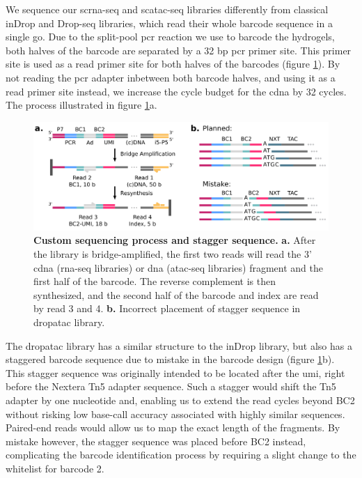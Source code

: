 We sequence our \acrshort{scrna-seq} and \acrshort{scatac-seq} libraries differently from classical inDrop and Drop-seq libraries, which read their whole barcode sequence in a single go. Due to the split-pool \acrshort{pcr} reaction we use to barcode the hydrogels, both halves of the barcode are separated by a 32 \acrshort{bp} \acrshort{pcr} primer site. This primer site is used as a read primer site for both halves of the barcodes (figure \ref{fig:seq_nextseq_library}). By not reading the \acrshort{pcr} adapter inbetween both barcode halves, and using it as a read primer site instead, we increase the cycle budget for the \acrshort{cdna} by 32 cycles. The process illustrated in figure \ref{fig:seq_nextseq_library}a.\pms

\begin{figure}[ht]
\centerfloat
\includegraphics[width=\textwidth]{./ims/seq_nextseq_library.png}
\caption[Custom sequencing process and stagger sequence]{\textbf{Custom sequencing process and stagger sequence.} \textbf{a.} After the library is bridge-amplified, the first two reads will read the 3' \acrshort{cdna} (\acrshort{rna-seq} libraries) or \acrshort{dna} (\acrshort{atac-seq} libraries) fragment and the first half of the barcode. The reverse complement is then synthesized, and the second half of the barcode and index are read by read 3 and 4. \textbf{b.} Incorrect placement of stagger sequence in \acrshort{dropatac} library.}
\label{fig:seq_nextseq_library}
\end{figure}

The \acrshort{dropatac} library has a similar structure to the inDrop library, but also has a staggered barcode sequence due to mistake in the barcode design (figure \ref{fig:seq_nextseq_library}b). This stagger sequence was originally intended to be located after the \acrshort{umi}, right before the Nextera Tn5 adapter sequence. Such a stagger would shift the Tn5 adapter by one nucleotide and, enabling us to extend the read cycles beyond BC2 without risking low base-call accuracy associated with highly similar sequences. Paired-end reads would allow us to map the exact length of the fragments. By mistake however, the stagger sequence was placed before BC2 instead, complicating the barcode identification process by requiring a slight change to the whitelist for barcode 2.\pms

